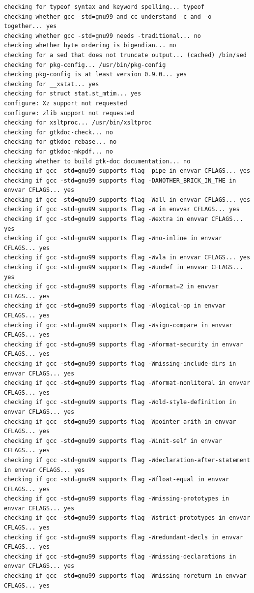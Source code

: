 \documentclass[11pt,a4paper]{article}
\begin{document}
{\begin{shaded}
\begin{verbatim}
checking for typeof syntax and keyword spelling... typeof
checking whether gcc -std=gnu99 and cc understand -c and -o together... yes
checking whether gcc -std=gnu99 needs -traditional... no
checking whether byte ordering is bigendian... no
checking for a sed that does not truncate output... (cached) /bin/sed
checking for pkg-config... /usr/bin/pkg-config
checking pkg-config is at least version 0.9.0... yes
checking for __xstat... yes
checking for struct stat.st_mtim... yes
configure: Xz support not requested
configure: zlib support not requested
checking for xsltproc... /usr/bin/xsltproc
checking for gtkdoc-check... no
checking for gtkdoc-rebase... no
checking for gtkdoc-mkpdf... no
checking whether to build gtk-doc documentation... no
checking if gcc -std=gnu99 supports flag -pipe in envvar CFLAGS... yes
checking if gcc -std=gnu99 supports flag -DANOTHER_BRICK_IN_THE in envvar CFLAGS... yes
checking if gcc -std=gnu99 supports flag -Wall in envvar CFLAGS... yes
checking if gcc -std=gnu99 supports flag -W in envvar CFLAGS... yes
checking if gcc -std=gnu99 supports flag -Wextra in envvar CFLAGS... yes
checking if gcc -std=gnu99 supports flag -Wno-inline in envvar CFLAGS... yes
checking if gcc -std=gnu99 supports flag -Wvla in envvar CFLAGS... yes
checking if gcc -std=gnu99 supports flag -Wundef in envvar CFLAGS... yes
checking if gcc -std=gnu99 supports flag -Wformat=2 in envvar CFLAGS... yes
checking if gcc -std=gnu99 supports flag -Wlogical-op in envvar CFLAGS... yes
checking if gcc -std=gnu99 supports flag -Wsign-compare in envvar CFLAGS... yes
checking if gcc -std=gnu99 supports flag -Wformat-security in envvar CFLAGS... yes
checking if gcc -std=gnu99 supports flag -Wmissing-include-dirs in envvar CFLAGS... yes
checking if gcc -std=gnu99 supports flag -Wformat-nonliteral in envvar CFLAGS... yes
checking if gcc -std=gnu99 supports flag -Wold-style-definition in envvar CFLAGS... yes
checking if gcc -std=gnu99 supports flag -Wpointer-arith in envvar CFLAGS... yes
checking if gcc -std=gnu99 supports flag -Winit-self in envvar CFLAGS... yes
checking if gcc -std=gnu99 supports flag -Wdeclaration-after-statement in envvar CFLAGS... yes
checking if gcc -std=gnu99 supports flag -Wfloat-equal in envvar CFLAGS... yes
checking if gcc -std=gnu99 supports flag -Wmissing-prototypes in envvar CFLAGS... yes
checking if gcc -std=gnu99 supports flag -Wstrict-prototypes in envvar CFLAGS... yes
checking if gcc -std=gnu99 supports flag -Wredundant-decls in envvar CFLAGS... yes
checking if gcc -std=gnu99 supports flag -Wmissing-declarations in envvar CFLAGS... yes
checking if gcc -std=gnu99 supports flag -Wmissing-noreturn in envvar CFLAGS... yes

\end{verbatim}
\end{shaded}}
\end{document}
